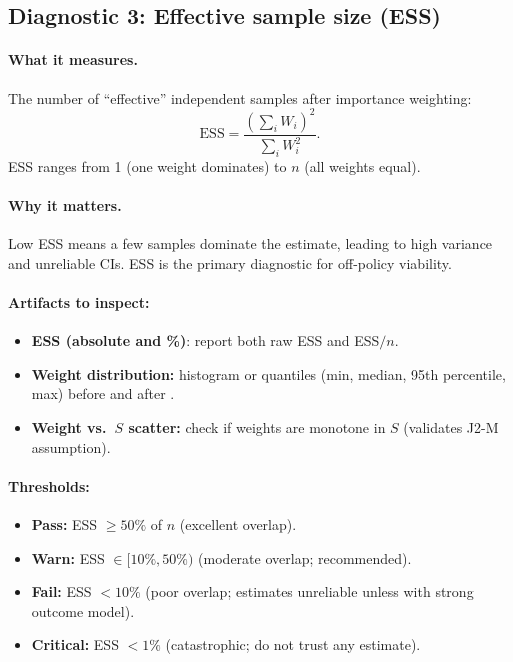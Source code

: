 \subsection{Diagnostic 3: Effective sample size (ESS)}

\paragraph{What it measures.} The number of ``effective'' independent samples after importance weighting:
\begin{equation}
\text{ESS} = \frac{\left( \sum_i W_i \right)^2}{\sum_i W_i^2}.
\end{equation}
ESS ranges from 1 (one weight dominates) to $n$ (all weights equal).

\paragraph{Why it matters.} Low ESS means a few samples dominate the estimate, leading to high variance and unreliable CIs. ESS is the primary diagnostic for off-policy viability.

\paragraph{Artifacts to inspect:}
\begin{itemize}
\item \textbf{ESS (absolute and \%)}: report both raw ESS and ESS$/n$.
\item \textbf{Weight distribution:} histogram or quantiles (min, median, 95th percentile, max) before and after \simcal.
\item \textbf{Weight vs.\ $S$ scatter:} check if weights are monotone in $S$ (validates J2-M assumption).
\end{itemize}

\paragraph{Thresholds:}
\begin{itemize}
\item \textbf{Pass:} ESS $\ge 50\%$ of $n$ (excellent overlap).
\item \textbf{Warn:} ESS $\in [10\%, 50\%)$ (moderate overlap; \dr{} recommended).
\item \textbf{Fail:} ESS $< 10\%$ (poor overlap; estimates unreliable unless \dr{} with strong outcome model).
\item \textbf{Critical:} ESS $< 1\%$ (catastrophic; do not trust any estimate).
\end{itemize}


